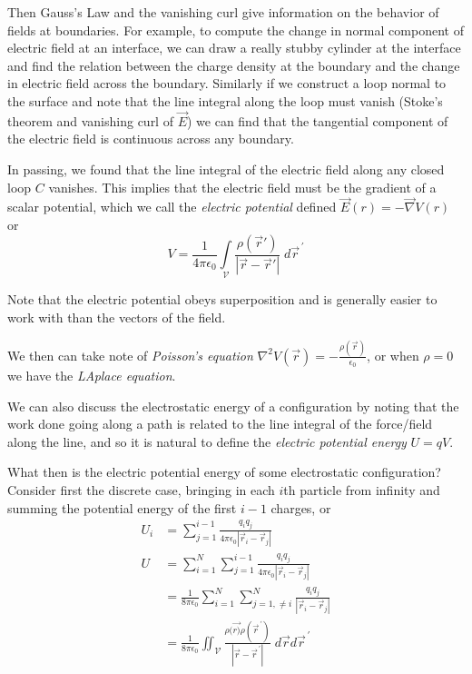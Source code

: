 \documentclass[10pt]{report}
\newcommand{\abs}[1]{\left|#1\right|}
\begin{document}
Then Gauss's Law and the vanishing curl give information on the behavior of fields at boundaries. For example, to compute the change in normal component of electric field at an interface, we can draw a really stubby cylinder at the interface and find the relation between the charge density at the boundary and the change in electric field across the boundary. Similarly if we construct a loop normal to the surface and note that the line integral along the loop must vanish (Stoke's theorem and vanishing curl of $\vec{E}$) we can find that the tangential component of the electric field is continuous across any boundary.

In passing, we found that the line integral of the electric field along any closed loop $C$ vanishes. This implies that the electric field must be the gradient of a scalar potential, which we call the \emph{electric potential} defined $\vec{E}(r) = -\vec{\nabla}V(r)$ or 
$$V = \frac{1}{4\pi \epsilon_0}\displaystyle\int\limits_{\mathcal{V}}^{}\frac{\rho(\vec{r}')}{\abs{\vec{r} - \vec{r}'}}\;d\vec{r}^{\,\prime}$$

Note that the electric potential obeys superposition and is generally easier to work with than the vectors of the field.

We then can take note of \emph{Poisson's equation} $\nabla^2 V(\vec{r}) = -\frac{\rho(\vec{r})}{\epsilon_0}$, or when $\rho = 0$ we have the \emph{LAplace equation}.

We can also discuss the electrostatic energy of a configuration by noting that the work done going along a path is related to the line integral of the force/field along the line, and so it is natural to define the \emph{electric potential energy} $U = qV$. 

What then is the electric potential energy of some electrostatic configuration? Consider first the discrete case, bringing in each $i$th particle from infinity and summing the potential energy of the first $i-1$ charges, or
\begin{align}
    U_i &= \sum_{j=1}^{i-1}\frac{q_iq_j}{4\pi\epsilon_0\abs{\vec{r}_i - \vec{r}_j}}\\
    U &= \sum_{i=1}^{N}\sum_{j=1}^{i-1}\frac{q_iq_j}{4\pi\epsilon_0\abs{\vec{r}_i - \vec{r}_j}}\\
    &= \frac{1}{8\pi\epsilon_0}\sum_{i=1}^{N}\sum_{j=1, \neq i}^{N}\frac{q_iq_j}{\abs{\vec{r}_i - \vec{r}_j}}\\
    &= \frac{1}{8\pi\epsilon_0}\iint_\mathcal{V} \frac{\rho(\vec{r)}\rho(\vec{r}^{\,\prime})}{\abs{\vec{r} - \vec{r}^{\,\prime}}}\; d\vec{r}d\vec{r}^{\,\prime}
    \label{2.13.int}
\end{align}
\end{document}
